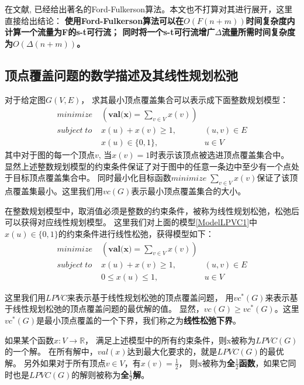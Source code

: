 在文献\cite{ford1962flows}, 已经给出著名的Ford-Fulkerson算法。本文也不打算对其进行展开，这里直接给出结论：
\textbf{使用Ford-Fulkerson算法可以在$O(F(n + m))$时间复杂度内计算一个流量为F的s-t可行流；
同时将一个s-t可行流增广$\Delta$流量所需时间复杂度为$O(\Delta(n + m))$。}

\subsection{顶点覆盖问题的数学描述及其线性规划松弛}
对于给定图$G(V, E)$， 求其最小顶点覆盖集合可以表示成下面整数规划模型：
\begin{equation} \label{ModelLPVC1} \begin{aligned}
  minimize\; & (\textbf{val(x)} = \sum_{v \in V}{x(v)}) &\\
  subject\; to\; & x(u) + x(v) \ge 1, &(u, v) \in E \\
   & x(u) \in \{0, 1\}, & u \in V
\end{aligned} \end{equation}
其中对于图的每一个顶点$v$, 当$x(v) = 1$时表示该顶点被选进顶点覆盖集合中。
显然上述整数规划模型的约束条件保证了对于图中的任意一条边中至少有一个点处于目标顶点覆盖集合中。
同时最小化目标函数$minimize\; \sum_{v \in V}{x(v)}$保证了该顶点覆盖集最小。这里我们用$vc(G)$表示最小顶点覆盖集合的大小。

在整数规划模型中，取消值必须是整数的约束条件，被称为线性规划松弛，松弛后可以获得对应线性规划模型。
这里我们对上面的模型\ref{ModelLPVC1}中$x(u) \in \{0, 1\}$的约束条件进行线性松弛，获得模型如下：
\begin{equation} \begin{aligned}
  minimize\; & (\textbf{val(x)} = \sum_{v \in V}{x(v)}) &\\
  subject\; to\; & x(u) + x(v) \ge 1, &(u, v) \in E \\
   & 0 \le x(u) \le 1, & u \in V
\end{aligned} \end{equation}

这里我们用$LPVC$来表示基于线性规划松弛的顶点覆盖问题，
用$vc^{*}(G)$来表示基于线性规划松弛的顶点覆盖问题的最优解的值。
显然，$vc(G) \ge vc^*(G)$。这里$vc^{*}(G)$是最小顶点覆盖的一个下界，我们称之为\textbf{线性松弛下界}。

如果某个函数$x:V \rightarrow \mathbb{R}$， 满足上述模型中的所有约束条件，则x被称为$LPVC(G)$的一个解。
在所有解中，$val(x)$达到最大化要求的，就是$LPVC(G)$的最优解。
另外如果对于所有顶点$v \in V$，有$x(v) = \frac{1}{2}$，
则x被称为\textbf{全$\frac{1}{2}$函数}，如果它同时也是$LPVC(G)$的解则被称为\textbf{全$\frac{1}{2}$解}。



